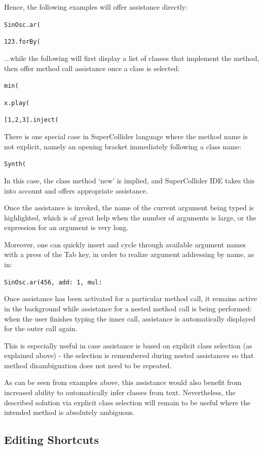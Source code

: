 \documentclass[11pt,a4paper]{article}
\begin{document}
Hence, the following examples will offer assistance directly:

\verb|SinOsc.ar(|

\verb|123.forBy(|

...while the following will first display a list of classes that implement the method, then offer
method call assistance once a class is selected:

\verb|min(|

\verb|x.play(|

\verb|[1,2,3].inject(|

There is one special case in SuperCollider language where the method name is not explicit, namely
an opening bracket immediately following a class name:

\verb|Synth(|

In this case, the class method `new' is implied, and SuperCollider IDE takes this into account and
offers appropriate assistance.

Once the assistance is invoked, the name of the current argument being typed is highlighted, which
is of great help when the number of arguments is large, or the expression for an argument is very
long.

Moreover, one can quickly insert and cycle through available argument names with a press of the Tab
key, in order to realize argument addressing by name, as in:

\verb|SinOsc.ar(456, add: 1, mul:|

Once assistance has been activated for a particular method call, it remains active in the
background while assistance for a nested method call is being performed: when the user
finishes typing the inner call, assistance is automatically displayed for the outer call again.

This is especially useful in case assistance is based on explicit class selection (as explained
above) - the selection is remembered during nested assistances so that method disambiguation does
not need to be repeated.

As can be seen from examples above, this assistance would also benefit from increased ability to
automatically infer classes from text. Nevertheless, the described solution via explicit class
selection will remain to be useful where the intended method is absolutely ambiguous.

\subsection{Editing Shortcuts}
\end{document}
